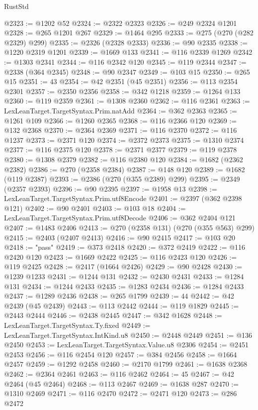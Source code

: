 \begin{lexlean}{RustStd}
\begin{coremodule}
@2323 := @1202 @52
@2324 := @2322 @2323
@2326 := @249 @2324 @1201
@2328 := @265 @1201 @267
@2329 := @1464 @295
@2333 := @275 (@270 (@282 @2329) @299)
@2335 := @2326 (@2328 @2333)
@2336 := @90 @2335
@2338 := @1220 @2319 @1201
@2339 := @1669 @133
@2341 := @116 @2339 @1269
@2342 := @1303 @2341
@2344 := @116 @2342 @120
@2345 := @119 @2344
@2347 := @2338 (@364 @2345)
@2348 := @90 @2347
@2349 := @103 @15
@2350 := @265 @15
@2351 := 43
@2354 := @42 @2351 (@45 @2351)
@2356 := @113 @2354 @2301
@2357 := @2350 @2356
@2358 := @342 @1218
@2359 := @1264 @133
@2360 := @119 @2359
@2361 := @1308 @2360
@2362 := @116 @2361
@2363 := LexLeanTarget.TargetSyntax.Prim.natAdd
@2364 := @362 @2363
@2365 := @1261 @109
@2366 := @1260 @2365
@2368 := @116 @2366 @120
@2369 := @132 @2368
@2370 := @2364 @2369
@2371 := @116 @2370
@2372 := @116 @1237
@2373 := @2371 @120
@2374 := @2372 @2373
@2375 := @1310 @2374
@2377 := @116 @2375 @120
@2378 := @2371 @2377
@2379 := @119 @2378
@2380 := @1308 @2379
@2382 := @116 @2380 @120
@2384 := @1682 (@2362 @2382)
@2386 := @270 (@2358 @2384)
@2387 := @148 @120
@2389 := @1682 (@119 @2387)
@2393 := @2386 (@270 (@355 @2389) @299)
@2395 := @2349 (@2357 @2393)
@2396 := @90 @2395
@2397 := @1958 @13
@2398 := LexLeanTarget.TargetSyntax.Prim.utf8Encode
@2401 := @2397 (@362 @2398 @121)
@2402 := @90 @2401
@2403 := @103 @18
@2404 := LexLeanTarget.TargetSyntax.Prim.utf8Decode
@2406 := @362 @2404 @121
@2407 := @1483 @2406
@2413 := @270 (@2358 @131) (@270 (@355 @563) @299)
@2415 := @2403 (@2407 @2413)
@2416 := @90 @2415
@2417 := @103 @20
@2418 := "pass"
@2419 := @373 @2418
@2420 := @372 @2419
@2422 := @116 @2420 @120
@2423 := @1669 @2422
@2425 := @116 @2423 @120
@2426 := @119 @2425
@2428 := @2417 (@1664 @2426)
@2429 := @90 @2428
@2430 := @1239 @1233
@2431 := @1244 @131
@2432 := @2430 @2431
@2433 := @1284 @131
@2434 := @1244 @2433
@2435 := @1283 @2434
@2436 := @1284 @2433
@2437 := @1289 @2436
@2438 := @265 @1799
@2439 := 44
@2442 := @42 @2439 (@45 @2439)
@2443 := @113 @2442
@2444 := @119 @1829
@2445 := @2443 @2444
@2446 := @2438 @2445
@2447 := @342 @1628
@2448 := LexLeanTarget.TargetSyntax.Ty.fixed
@2449 := LexLeanTarget.TargetSyntax.IntKind.u8
@2450 := @2448 @2449
@2451 := @136 @2450
@2453 := LexLeanTarget.TargetSyntax.Value.u8 @2306
@2454 := @2451 @2453
@2456 := @116 @2454 @120
@2457 := @384 @2456
@2458 := @1664 @2457
@2459 := @1292 @2458
@2460 := @2170 @1799
@2461 := @1638 @2368
@2462 := @2364 @2461
@2463 := @116 @2462
@2464 := 45
@2467 := @42 @2464 (@45 @2464)
@2468 := @113 @2467
@2469 := @1638 @287
@2470 := @1310 @2469
@2471 := @116 @2470
@2472 := @2471 @120
@2473 := @286 @2472

\end{coremodule}
\end{lexlean}
